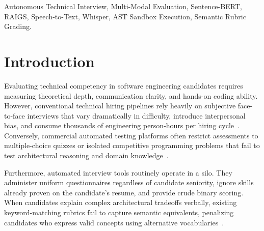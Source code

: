 \documentclass[conference]{IEEEtran}
\begin{document}
\begin{IEEEkeywords}
Autonomous Technical Interview, Multi-Modal Evaluation, Sentence-BERT, RAIGS, Speech-to-Text, Whisper, AST Sandbox Execution, Semantic Rubric Grading.
\end{IEEEkeywords}

\section{Introduction}
Evaluating technical competency in software engineering candidates requires measuring theoretical depth, communication clarity, and hands-on coding ability. However, conventional technical hiring pipelines rely heavily on subjective face-to-face interviews that vary dramatically in difficulty, introduce interpersonal bias, and consume thousands of engineering person-hours per hiring cycle~\cite{sackett2022revisiting}. Conversely, commercial automated testing platforms often restrict assessments to multiple-choice quizzes or isolated competitive programming problems that fail to test architectural reasoning and domain knowledge~\cite{zhang2023job}.

Furthermore, automated interview tools routinely operate in a silo. They administer uniform questionnaires regardless of candidate seniority, ignore skills already proven on the candidate's resume, and provide crude binary scoring. When candidates explain complex architectural tradeoffs verbally, existing keyword-matching rubrics fail to capture semantic equivalents, penalizing candidates who express valid concepts using alternative vocabularies~\cite{reimers2019sentence}.
\end{document}
